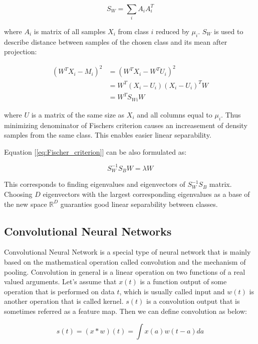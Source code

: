 \documentclass[a4paper, 10 pt, conference]{ieeeconf}
\begin{document}
\begin{equation}
    S_{W} = \sum_{i} A_{i}A_{i}^T
\end{equation}

where $A_i$ is matrix of all samples $X_i$ from class $i$ reduced by $\mu_i$. $S_W$ is used to describe distance between samples of the chosen class and its mean after projection:

\begin{align}
    (W^{T} X_i - M_i)^2 &= (W^{T} X_i - W^{T} U_i)^2 \nonumber \\
                        &= W^{T} (X_i - U_i)(X_i - U_i)^T W \\
                        &= W^{T} S_{Wi} W \nonumber
\end{align}

where $U$ is a matrix of the same size as $X_i$ and all columns equal to $\mu_i$. Thus minimizing denominator of Fischers criterion causes an increasement of density samples from the same class. This enables easier linear separability.

Equation [\ref{eq:Fischer_criterion}] can be also formulated as:

\begin{equation}
    S_{W}^{-1} S_{B} W = \lambda W
\end{equation}

This corresponds to finding eigenvalues and eigenvectors of $S_{W}^{-1} S_{B}$ matrix. Choosing $D$ eigenvectors with the largest corresponding eigenvalues as a base of the new space $\mathbb{R}^D$ guaranties good linear separability between classes. 

\subsection{Convolutional Neural Networks}

Convolutional Neural Network is a special type of neural network that is mainly based on the mathematical operation called convolution and the mechanism of pooling. Convolution in general is a linear operation on two functions of a real valued arguments. Let's assume that $x(t)$ is a function output of some operation that is performed on data $t$, which is usually called input and $w(t)$ is another operation that is called kernel. $s(t)$ is a convolution output that is sometimes referred as a feature map. Then we can define convolution as below:

\begin{equation}
    s(t) = (x*w)(t) = \int x(a)w(t-a)da
\end{equation}
\end{document}
